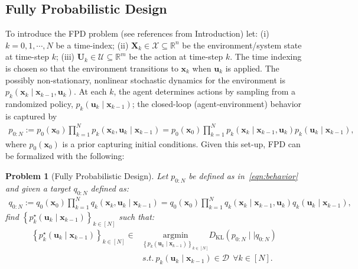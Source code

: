 \documentclass[a4paper,fleqn]{cas-sc}
\newtheorem{Problem}{Problem}
\newcommand{\R}{\mathbb{R}}
\newcommand{\bv}[1]{\mathbf{#1}}
\newcommand{\sD}{\mathcal{D}}
\newcommand{\sX}{\mathcal{X}}
\newcommand{\sU}{\mathcal{U}}
\newcommand{\DKL}[2]{{D}_{\text{KL}}\left(#1\mid \mid #2 \right)}
\newcommand{\plant}[2]{p_{{#1}} \left(\bv{x}_{{#1}}\mid \bv{x}_{{#2}}, \bv{u}_{{#1}} \right)}
\newcommand{\policy}[2]{p_{{#1}}\left(\bv{u}_{{#1}}\mid \bv{x}_{{#2}} \right)}
\newcommand{\optimalpolicy}[2]{p^{\star}_{{#1}} \left(\bv{u}_{{#1}}\mid \bv{x}_{{#2}} \right)}
\newcommand{\refplant}[2]{q_{{#1}} \left(\bv{x}_{{#1}}\mid \bv{x}_{{#2}}, \bv{u}_{{#1}} \right)}
\newcommand{\refpolicy}[2]{q_{{#1}}\left(\bv{u}_{{#1}}\mid \bv{x}_{{#2}} \right)}
\newcommand{\jointxu}[2]{p_{{#1}}\left(\bv{x}_{{#1}},\bv{u}_{{#1}}\mid \bv{x}_{{#2}} \right)}
\newcommand{\refjointxu}[2]{q_{{#1}}\left(\bv{x}_{{#1}},\bv{u}_{{#1}}\mid \bv{x}_{{#2}} \right)}
\begin{document}
\subsection{Fully Probabilistic Design}
To introduce the FPD problem (see references from Introduction) let: (i) $k=0,1,\cdots,N$ be a time-index; (ii) $\bv{X}_k\in\sX\subseteq\R^n$ be the environment/system state at time-step $k$; (iii) $\bv{U}_k\in\sU\subseteq\R^m$ be the action at time-step $k$.  The time indexing is chosen so that the environment transitions to $\bv{x}_k$ when $\bv{u}_k$ is applied.  The possibly non-stationary, nonlinear stochastic dynamics for the environment is $\plant{k}{k-1}$. At each $k$, the agent determines actions by sampling from a randomized policy, $\policy{k}{k-1}$; the closed-loop (agent-environment) behavior is captured by 
\begin{align}\label{eqn:behavior}
p_{0:N} := p_{0}\left(\bv{x}_0\right)\prod_{k=1}^N \jointxu{k}{k-1} = p_{0}\left(\bv{x}_0\right)\prod_{k=1}^N \plant{k}{k-1}\policy{k}{k-1},
\end{align}
where $p_{0}\left(\bv{x}_0\right)$ is a prior capturing initial conditions. Given this set-up,  FPD can be formalized with the following:
\begin{Problem}[Fully Probabilistic Design]\label{prob:FPD}
Let $p_{0:N}$ be defined as in~\eqref{eqn:behavior} and given a target $q_{0:N}$ defined as:
\begin{align}\label{eqn:refbehaviorb}
q_{0:N} := q_{0}\left(\bv{x}_0\right)\prod_{k=1}^N \refjointxu{k}{k-1} = q_{0}\left(\bv{x}_0\right)\prod_{k=1}^N \refplant{k}{k-1}\refpolicy{k}{k-1},
\end{align}
find $\left\{\optimalpolicy{k}{k-1}\right\}_{k\in[N]}$ such that: 
\begin{equation}\label{eqn:main_problemb}
    \begin{aligned}
{\left\{\optimalpolicy{k}{k-1}\right\}_{k\in[N]}}\in & \underset{\left\{ \policy{k}{k-1}\right\}_{k\in[N]}}{\mathrm{argmin}}
    \DKL{p_{0:N}}{q_{0:N}}  \\
   &  s.t.  \  \policy{k}{k-1}\in\sD \ \ \forall k\in [N].
    \end{aligned}
\end{equation}
\end{Problem}
\end{document}
